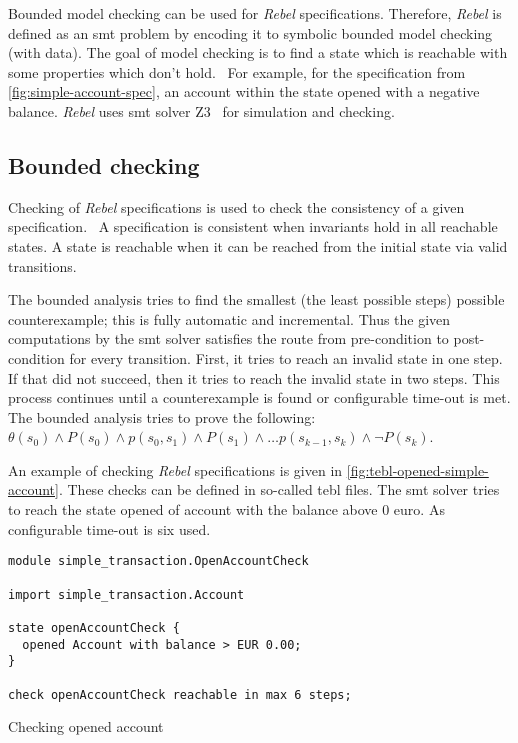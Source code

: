 Bounded model checking can be used for \textit{Rebel} specifications. Therefore, \textit{Rebel} is defined as an \gls{smt} problem by encoding it to symbolic bounded model checking (with data). The goal of model checking is to find a state which is reachable with some properties which don't hold.~\cite[p.~5]{stoel_storm_vinju_bosman_2016} For example, for the specification from \autoref{fig:simple-account-spec}, an account within the state opened with a negative balance. \textit{Rebel} uses \gls{smt} solver Z3~\cite{moura_bjorner_2008} for simulation and checking.

\subsection{Bounded checking}

Checking of \textit{Rebel} specifications is used to check the consistency of a given specification.~\cite[p.~5]{stoel_storm_vinju_bosman_2016} A specification is consistent when invariants hold in all reachable states. A state is reachable when it can be reached from the initial state via valid transitions.

The bounded analysis tries to find the smallest (the least possible steps) possible counterexample; this is fully automatic and incremental. Thus the given computations by the \gls{smt} solver satisfies the route from pre-condition to post-condition for every transition.
First, it tries to reach an invalid state in one step. If that did not succeed, then it tries to reach the invalid state in two steps. This process continues until a counterexample is found or configurable time-out is met. The bounded analysis tries to prove the following: $\theta (s_{0}) \land P(s_{0}) \land p(s_{0}, s_{1}) \land P(s_{1}) \land \dots p(s_{k-1}, s_{k}) \land \neg P(s_{k})$.

An example of checking \textit{Rebel} specifications is given in \autoref{fig:tebl-opened-simple-account}. These checks can be defined in so-called tebl files. The \gls{smt} solver tries to reach the state opened of account with the balance above 0 euro. As configurable time-out is six used.

\begin{sourcecode}[h!]
\begin{lstlisting}[]
module simple_transaction.OpenAccountCheck

import simple_transaction.Account

state openAccountCheck {
  opened Account with balance > EUR 0.00;
}

check openAccountCheck reachable in max 6 steps;
\end{lstlisting}
\caption{Checking opened account}\label{fig:tebl-opened-simple-account}
\end{sourcecode}
\FloatBarrier

